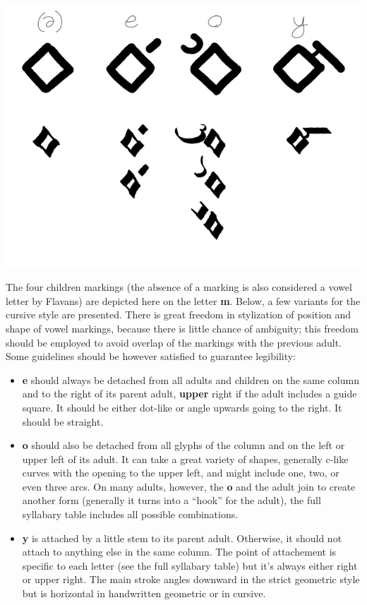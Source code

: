 \documentclass[10pt,oneside]{memoir}
\begin{document}
\begin{center}
    \includegraphics{childrenguide_small}
\end{center}

The four children markings (the absence of a marking is also considered a vowel letter by Flavans) are depicted here on the letter \textbf{m}. Below, a few variants for the cursive style are presented. There is great freedom in stylization of position and shape of vowel markings, because there is little chance of ambiguity; this freedom should be employed to avoid overlap of the markings with the previous adult. Some guidelines should be however satisfied to guarantee legibility:

\begin{itemize}
    \item \textbf{e} should always be detached from all adults and children on the same column and to the right of its parent adult, \textbf{upper} right if the adult includes a guide square. It should be either dot-like or angle upwards going to the right. It should be straight.
    \item \textbf{o} should also be detached from all glyphs of the column and on the left or upper left of its adult. It can take a great variety of shapes, generally c-like curves with the opening to the upper left, and might include one, two, or even three arcs. On many adults, however, the \textbf{o} and the adult join to create another form (generally it turns into a ``hook'' for the adult), the full syllabary table includes all possible combinations.
    \item \textbf{y} is attached by a little stem to its parent adult. Otherwise, it should not attach to anything else in the same column. The point of attachement is specific to each letter (see the full syllabary table) but it's always either right or upper right. The main stroke angles downward in the strict geometric style but is horizontal in handwritten geometric or in cursive.
\end{itemize}
\end{document}
